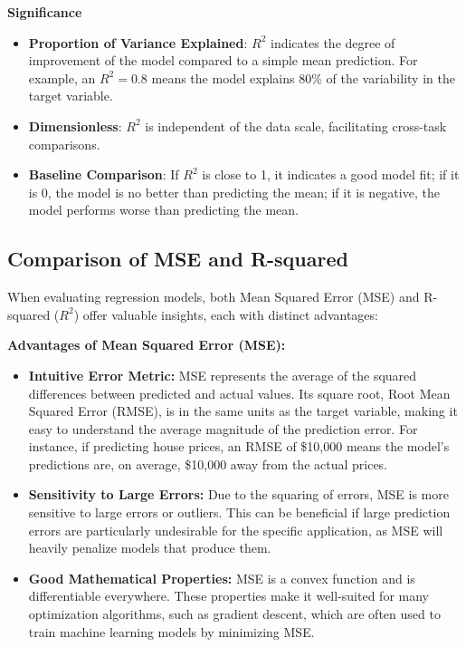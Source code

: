 \documentclass{article}
\begin{document}
\textbf{Significance}
\begin{itemize}
    \item \textbf{Proportion of Variance Explained}: $R^2$ indicates the degree of improvement of the model compared to a simple mean prediction. For example, an $R^2=0.8$ means the model explains 80\% of the variability in the target variable.
    \item \textbf{Dimensionless}: $R^2$ is independent of the data scale, facilitating cross-task comparisons.
    \item \textbf{Baseline Comparison}: If $R^2$ is close to 1, it indicates a good model fit; if it is 0, the model is no better than predicting the mean; if it is negative, the model performs worse than predicting the mean.
\end{itemize}


\subsection*{Comparison of MSE and R-squared}

When evaluating regression models, both Mean Squared Error (MSE) and R-squared ($R^2$) offer valuable insights, each with distinct advantages:

\textbf{Advantages of Mean Squared Error (MSE):}
\begin{itemize}
    \item \textbf{Intuitive Error Metric:} MSE represents the average of the squared differences between predicted and actual values. Its square root, Root Mean Squared Error (RMSE), is in the same units as the target variable, making it easy to understand the average magnitude of the prediction error. For instance, if predicting house prices, an RMSE of \$10,000 means the model's predictions are, on average, \$10,000 away from the actual prices.
    \item \textbf{Sensitivity to Large Errors:} Due to the squaring of errors, MSE is more sensitive to large errors or outliers. This can be beneficial if large prediction errors are particularly undesirable for the specific application, as MSE will heavily penalize models that produce them.
    \item \textbf{Good Mathematical Properties:} MSE is a convex function and is differentiable everywhere. These properties make it well-suited for many optimization algorithms, such as gradient descent, which are often used to train machine learning models by minimizing MSE.
\end{itemize}
\end{document}
